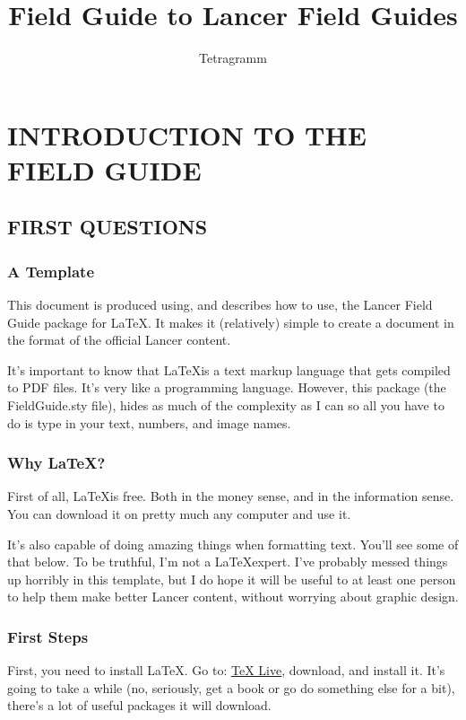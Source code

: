 \documentclass[twoside,headings,letterpaper,twocolumn]{article}
\title{Field Guide to Lancer Field Guides}
\author{Tetragramm}
\begin{document}
\frontmatter

\maketitle

\clearpage

\tableofcontents
\mainmatter
\section{INTRODUCTION TO THE FIELD GUIDE}
\subsection{FIRST QUESTIONS}
\subsubsection{A Template}
This document is produced using, and describes how to use, the Lancer Field Guide package for \LaTeX.  It makes it (relatively) simple to create a document in the format of the official Lancer content.

It's important to know that \LaTeX is a text markup language that gets compiled to PDF files.  It's very like a programming language.  However, this package (the FieldGuide.sty file), hides as much of the complexity as I can so all you have to do is type in your text, numbers, and image names.

\subsubsection{Why LaTeX?}
First of all, \LaTeX is free.  Both in the money sense, and in the information sense.  You can download it on pretty much any computer and use it.

It's also capable of doing amazing things when formatting text.  You'll see some of that below.  To be truthful, I'm not a \LaTeX expert.  I've probably messed things up horribly in this template, but I do hope it will be useful to at least one person to help them make better Lancer content, without worrying about graphic design.

\subsubsection{First Steps}
First, you need to install \LaTeX.  Go to: \href{https://tug.org/texlive/}{\color{blue}\underline{TeX Live}}, download, and install it.  It's going to take a while (no, seriously, get a book or go do something else for a bit), there's a lot of useful packages it will download.
\end{document}
